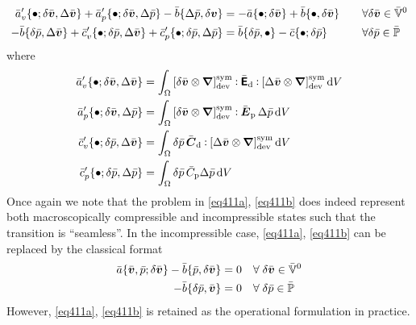 \documentclass[10pt,a4paper]{article}
\newcommand{\ded}{\mathrm{d}}
\newcommand{\dep}{\mathrm{p}}
\begin{document}
\begin{align}
 \bar{a}'_v\{\bullet; \delta\bar{\boldsymbol{v}},\Delta\bar{\boldsymbol{v}}\} + \bar{a}'_p\{\bullet; \delta\bar{\boldsymbol{v}},\Delta\bar{p}\} - \bar{b}\{\Delta\bar p, \delta{\boldsymbol{v}}\}
	  &= -\bar{a}\{\bullet; \delta\bar{\boldsymbol{v}}\} + \bar{b}\{\bullet, \delta\bar{\boldsymbol{v}}\}
\quad &&\forall \delta\bar{\boldsymbol{v}}\in \bar{\mathbb{V}}^0
 \label{eq414a}\\
- \bar{b}\{\delta\bar p, \Delta\bar{\boldsymbol{v}}\} + \bar{c}'_v\{\bullet; \delta\bar{p}, \Delta\bar{ \boldsymbol{v}}\} + \bar{c}'_p\{\bullet; \delta\bar{p},\Delta\bar{p}\}
	  &= \bar{b}\{\delta\bar{p},\bullet\} - \bar{c}\{\bullet;\delta\bar{p}\}
\quad &&\forall \delta\bar{p} \in \bar{\mathbb{P}}
 \label{eq414b}
\end{align}
where
\begin{align}
 \bar{a}'_v\{\bullet; \delta\bar{\ta v},\Delta\bar{\ta v}\} &= \int_\Omega \left[\delta\bar{\ta v}\outerp\diff\right]^\sym_\dev \dprod \bar{\tf{E}}_\ded \dprod \left[\Delta\bar{\ta v}\outerp\diff\right]^\sym_\dev \dif V
 \label{eq415a}\\
 \bar{a}'_p\{\bullet; \delta\bar{\ta v},\Delta\bar{p}\}     &= \int_\Omega \left[\delta\bar{\ta v}\outerp\diff\right]^\sym_\dev \dprod \bar{\ts E}_\dep \,\Delta\bar{p} \dif V
 \label{eq415b}\\
 \bar{c}'_v\{\bullet; \delta\bar{p}, \Delta\bar{ \ta v}\}   &= \int_\Omega \delta\bar{p} \,\bar{\ts C}_\ded \dprod \left[\Delta\bar{\ta v}\outerp\diff\right]^\sym_\dev \dif V
 \label{eq415c}\\
 \bar{c}'_p\{\bullet; \delta\bar{p},\Delta\bar{p}\}         &= \int_\Omega \delta\bar{p} \,\bar{C}_\dep \Delta\bar p\dif V
 \label{eq415d}
\end{align}
Once again we note that the problem in \eqref{eq411a}, \eqref{eq411b} does indeed represent both macroscopically compressible and incompressible states such that the transition is ``seamless''.
In the incompressible case, \eqref{eq411a}, \eqref{eq411b} can be replaced by the classical format
\begin{align}
 \bar a\{\bar{\boldsymbol{v}},\bar p; \delta\bar{\boldsymbol{v}}\} - \bar b\{\bar p, \delta\bar{\boldsymbol{v}}\} &= 0   \quad \forall\; \delta\bar{\boldsymbol{v}} \in \bar{\mathbb{V}}^0
 \label{eq420a}\\
 - \bar b\{\delta\bar p, \bar{\boldsymbol{v}}\} &= 0   \quad \forall\; \delta\bar p \in \bar{\mathbb{P}}
 \label{eq420b}
\end{align}
However, \eqref{eq411a}, \eqref{eq411b} is retained as the operational formulation in practice.
\end{document}
